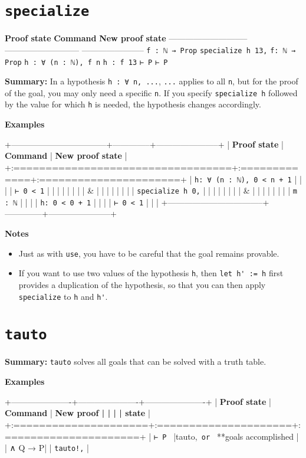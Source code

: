 \documentclass{memoir}
\begin{document}
\section{\Verb|specialize|}

\textbf{Proof state} \textbf{Command} \textbf{New proof state}
----------------------------- --------------------------- -----------------------
\Verb|f : ℕ → Prop| \Verb|specialize h 13,| \Verb|f: ℕ → Prop|
\Verb|h : ∀ (n : ℕ), f n| \Verb|h : f 13|
\Verb|⊢ P| \Verb|⊢ P|

\textbf{Summary:} In a hypothesis \Verb|h : ∀ n, ...|, \Verb|...| applies to all \Verb|n|, but for the proof of the goal, you may only need a specific \Verb|n|. If you specify \Verb|specialize h| followed by the value for which \Verb|h| is needed, the hypothesis changes accordingly.

\textbf{Examples}

+-----------------------------------+--------------+-----------------------+
| \textbf{Proof state} | \textbf{Command} | \textbf{New proof state} |
+:==================================+:=============+:======================+
| \Verb|h: ∀ (n : ℕ), 0 < n + 1| | | |
| \Verb|⊢ 0 < 1| | | |
| | | |
| & | | |
| | | |
| \Verb|specialize h 0,| | | |
| | | |
| & | | |
| | | |
| \Verb|m : ℕ| | | |
| \Verb|h: 0 < 0 + 1| | | |
| \Verb|⊢ 0 < 1| | | |
+-----------------------------------+--------------+-----------------------+

\textbf{Notes}

\begin{itemize}
\item Just as with \Verb|use|, you have to be careful that the goal remains provable.\item If you want to use two values of the hypothesis \Verb|h|, then \Verb|let h' := h| first provides a duplication of the hypothesis, so that you can then apply \Verb|specialize| to \Verb|h| and \Verb|h'|.

\end{itemize}




\section{\Verb|tauto|}

\textbf{Summary:} \Verb|tauto| solves all goals that can be solved with a truth table.

\textbf{Examples}

+----------------------+----------------------+----------------------+
| \textbf{Proof state} | \textbf{Command} | \textbf{New proof |
| | | state} |
+:=====================+:=====================+:=====================+
| \Verb|⊢ P | |tauto,\Verb| or | **goals accomplished |
| ∧ Q → P| | \Verb|tauto!,| | 
\end{document}
